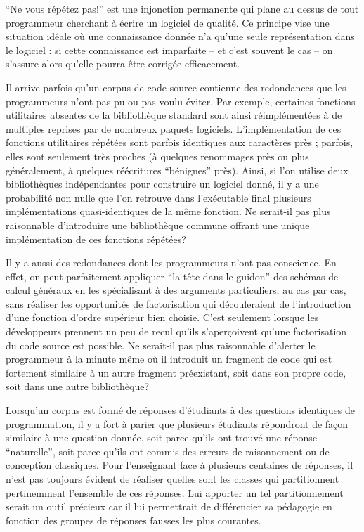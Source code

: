 
``Ne vous répétez pas!'' est une injonction permanente qui plane au
dessus de tout programmeur cherchant à écrire un logiciel de qualité.
Ce principe vise une situation idéale où une connaissance donnée n'a
qu'une seule représentation dans le logiciel : si cette connaissance
est imparfaite -- et c'est souvent le cas -- on s'assure alors qu'elle
pourra être corrigée efficacement.

Il arrive parfois qu'un corpus de code source contienne des
redondances que les programmeurs n'ont pas pu ou pas voulu éviter. Par
exemple, certaines fonctions utilitaires absentes de la bibliothèque
standard sont ainsi réimplémentées à de multiples reprises par de
nombreux paquets logiciels. L'implémentation de ces fonctions
utilitaires répétées sont parfois identiques aux caractères près ;
parfois, elles sont seulement très proches (à quelques renommages près
ou plus généralement, à quelques réécritures ``bénignes''
près). Ainsi, si l'on utilise deux bibliothèques indépendantes pour
construire un logiciel donné, il y a une probabilité non nulle que
l'on retrouve dans l'exécutable final plusieurs implémentations
quasi-identiques de la même fonction. Ne serait-il pas plus
raisonnable d'introduire une bibliothèque commune offrant une unique
implémentation de ces fonctions répétées?

Il y a aussi des redondances dont les programmeurs n'ont pas conscience.
En effet, on peut parfaitement appliquer ``la tête dans le guidon''
des schémas de calcul généraux en les spécialisant à des arguments
particuliers, au cas par cas, sans réaliser les opportunités de
factorisation qui découleraient de l'introduction d'une fonction
d'ordre supérieur bien choisie. C'est seulement lorsque les
développeurs prennent un peu de recul qu'ils s'aperçoivent qu'une
factorisation du code source est possible. Ne serait-il pas plus
raisonnable d'alerter le programmeur à la minute même où il introduit
un fragment de code qui est fortement similaire à un autre fragment
préexistant, soit dans son propre code, soit dans une autre
bibliothèque?

Lorsqu'un corpus est formé de réponses d'étudiants à des questions
identiques de programmation, il y a fort à parier que plusieurs
étudiants répondront de façon similaire à une question donnée, soit
parce qu'ils ont trouvé une réponse ``naturelle'', soit parce qu'ils
ont commis des erreurs de raisonnement ou de conception classiques.
Pour l'enseignant face à plusieurs centaines de réponses, il n'est pas
toujours évident de réaliser quelles sont les classes
qui partitionnent pertinemment l'ensemble de ces réponses. Lui
apporter un tel partitionnement serait un outil précieux car il
lui permettrait de différencier sa pédagogie en fonction des
groupes de réponses fausses les plus courantes.


